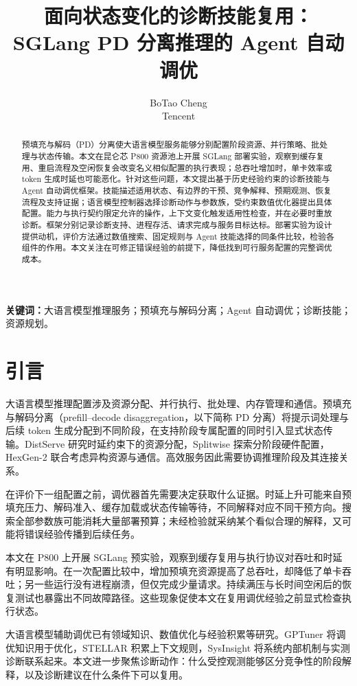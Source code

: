 \documentclass[UTF8,11pt,a4paper,fontset=windows]{ctexart}
\title{面向状态变化的诊断技能复用：\\SGLang PD 分离推理的 Agent 自动调优}
\author{BoTao Cheng\\Tencent}
\date{}
\begin{document}
\maketitle

\begin{abstract}
预填充与解码（PD）分离使大语言模型服务能够分别配置阶段资源、并行策略、批处理与状态传输。本文在昆仑芯 P800 资源池上开展 SGLang 部署实验，观察到缓存复用、重启流程及空闲恢复会改变名义相似配置的执行表现；总吞吐增加时，单卡效率或 token 生成时延也可能恶化。针对这些问题，本文提出基于历史经验约束的诊断技能与 Agent 自动调优框架。技能描述适用状态、有边界的干预、竞争解释、预期观测、恢复流程及支持证据；语言模型控制器选择诊断动作与参数族，受约束数值优化器提出具体配置。能力与执行契约限定允许的操作，上下文变化触发适用性检查，并在必要时重放诊断。框架分别记录诊断支持、进程存活、请求完成与服务目标达标。部署实验为设计提供动机，评价方法通过数值搜索、固定规则与 Agent 技能选择的同条件比较，检验各组件的作用。本文关注在可修正错误经验的前提下，降低找到可行服务配置的完整调优成本。

\end{abstract}

\noindent\textbf{关键词：}大语言模型推理服务；预填充与解码分离；Agent 自动调优；诊断技能；资源规划。

\section{引言}
大语言模型推理配置涉及资源分配、并行执行、批处理、内存管理和通信。预填充与解码分离（prefill--decode disaggregation，以下简称 PD 分离）将提示词处理与后续 token 生成分配到不同阶段，在支持阶段专属配置的同时引入显式状态传输。DistServe 研究时延约束下的资源分配，Splitwise 探索分阶段硬件配置，HexGen-2 联合考虑异构资源与通信\cite{distserve2024,splitwise2024,hexgen2025}。高效服务因此需要协调推理阶段及其连接关系。

在评价下一组配置之前，调优器首先需要决定获取什么证据。时延上升可能来自预填充压力、解码准入、缓存加载或状态传输等待，不同解释对应不同干预方向。搜索全部参数族可能消耗大量部署预算；未经检验就采纳某个看似合理的解释，又可能将错误经验传播到后续任务。

本文在 P800 上开展 SGLang 预实验，观察到缓存复用与执行协议对吞吐和时延有明显影响。在一次配置比较中，增加预填充资源提高了总吞吐，却降低了单卡吞吐；另一些运行没有进程崩溃，但仅完成少量请求。持续满压与长时间空闲后的恢复测试也暴露出不同故障路径。这些现象促使本文在复用调优经验之前显式检查执行状态。

大语言模型辅助调优已有领域知识、数值优化与经验积累等研究。GPTuner 将调优知识用于优化，STELLAR 积累上下文规则，SysInsight 将系统内部机制与实测诊断联系起来\cite{gptuner2024,stellar2025,sysinsight2026}。本文进一步聚焦诊断动作：什么受控观测能够区分竞争性的阶段解释，以及诊断建议在什么条件下可以复用。
\end{document}
